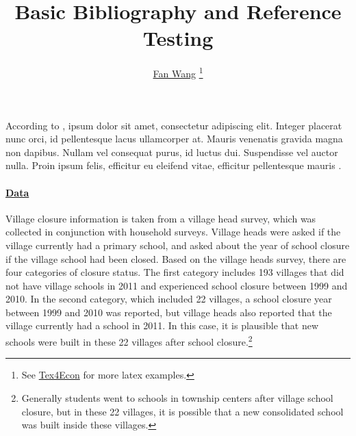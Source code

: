 \documentclass[12pt,english]{article}
\begin{document}
\title{Basic Bibliography and Reference Testing}
\author{\href{http://fanwangecon.github.io/}{Fan Wang} \thanks{See \href{https://fanwangecon.github.io/Tex4Econ/}{Tex4Econ} for more latex examples.}}

\maketitle

According to \textcite{becker_human_1986}, ipsum dolor sit amet, consectetur adipiscing elit. Integer placerat nunc orci, id pellentesque lacus ullamcorper at. Mauris venenatis gravida magna non dapibus. Nullam vel consequat purus, id luctus dui. Suspendisse vel auctor nulla. Proin ipsum felis, efficitur eu eleifend vitae, efficitur pellentesque mauris \autocite{case_lasting_2005, conti_understanding_2010}.

\paragraph{\href{https://papers.ssrn.com/sol3/papers.cfm?abstract_id=3140132}{Data}}

Village closure information is taken from a village head survey, which was collected in conjunction with household surveys. Village heads were asked if the village currently had a primary school, and asked about the year of school closure if the village school had been closed. Based on the village heads survey, there are four categories of closure status. The first category includes 193 villages that did not have village schools in 2011 and experienced school closure between 1999 and 2010. In the second category, which included 22 villages, a school closure year between 1999 and 2010 was reported, but village heads also reported that the village currently had a school in 2011. In this case, it is plausible that new schools were built in these 22 villages after school closure.\footnote{Generally students went to schools in township centers after village school closure, but in these 22 villages, it is possible that a new consolidated school was built inside these villages.}

\pagebreak
\begingroup
\setlength\bibitemsep{0pt}
\printbibliography
\endgroup
\pagebreak
\end{document}

